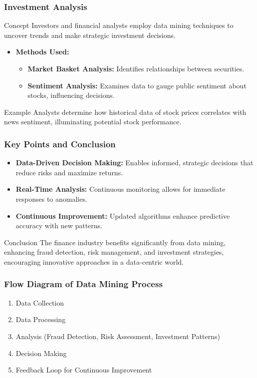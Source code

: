 \documentclass{beamer}
\begin{document}
\begin{frame}[fragile]
    \frametitle{Investment Analysis}
    \begin{block}{Concept}
        Investors and financial analysts employ data mining techniques to uncover trends and make strategic investment decisions.
    \end{block}
    \begin{itemize}
        \item \textbf{Methods Used:}
        \begin{itemize}
            \item \textbf{Market Basket Analysis:} Identifies relationships between securities.
            \item \textbf{Sentiment Analysis:} Examines data to gauge public sentiment about stocks, influencing decisions.
        \end{itemize}
    \end{itemize}
    \begin{block}{Example}
        Analysts determine how historical data of stock prices correlates with news sentiment, illuminating potential stock performance.
    \end{block}
\end{frame}

\begin{frame}[fragile]
    \frametitle{Key Points and Conclusion}
    \begin{itemize}
        \item \textbf{Data-Driven Decision Making:} Enables informed, strategic decisions that reduce risks and maximize returns.
        \item \textbf{Real-Time Analysis:} Continuous monitoring allows for immediate responses to anomalies.
        \item \textbf{Continuous Improvement:} Updated algorithms enhance predictive accuracy with new patterns.
    \end{itemize}
    \begin{block}{Conclusion}
        The finance industry benefits significantly from data mining, enhancing fraud detection, risk management, and investment strategies, encouraging innovative approaches in a data-centric world.
    \end{block}
\end{frame}

\begin{frame}[fragile]
    \frametitle{Flow Diagram of Data Mining Process}
    \begin{enumerate}
        \item Data Collection
        \item Data Processing
        \item Analysis (Fraud Detection, Risk Assessment, Investment Patterns)
        \item Decision Making
        \item Feedback Loop for Continuous Improvement
    \end{enumerate}
\end{frame}
\end{document}
